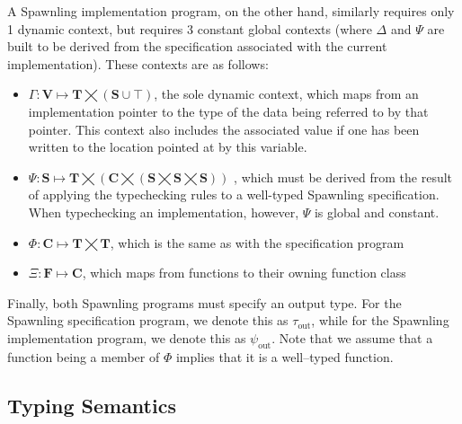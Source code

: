 A Spawnling implementation program, on the other hand, similarly requires only 1 dynamic context, but requires 3 constant global contexts (where $\Delta$ and $\Psi$ are built to be derived from the specification associated with the current implementation).  These contexts are as follows:
\begin{itemize}
\item $\Gamma:\mathbf{V}\mapsto\mathbf{T}\bigtimes\left(\mathbf{S}\cup\top\right)$, the sole dynamic context, which maps from an implementation pointer to the type of the data being referred to by that pointer.  This context also includes the associated value if one has been written to the location pointed at by this variable.
\item $\Psi:\mathbf{S}\mapsto
\mathbf{T}\bigtimes
\left(\mathbf{C}\bigtimes
\left(\mathbf{S}\bigtimes\mathbf{S}\bigtimes\mathbf{S}\right)
\right)$
, which must be derived from the result of applying the typechecking rules to a well-typed Spawnling specification.  When typechecking an implementation, however, $\Psi$ is global and constant.
\item $\Phi:\mathbf{C}\mapsto\mathbf{T}\bigtimes\mathbf{T}$, which is the same as with the specification program
\item $\Xi:\mathbf{F}\mapsto\mathbf{C}$, which maps from functions to their owning function class
\end{itemize}

Finally, both Spawnling programs must specify an output type.  For the Spawnling specification program, we denote this as $\tau_\textrm{out}$, while for the Spawnling implementation program, we denote this as $\psi_\textrm{out}$.  Note that we assume that a function being a member of $\Phi$ implies that it is a well--typed function.

\subsection{Typing Semantics}

